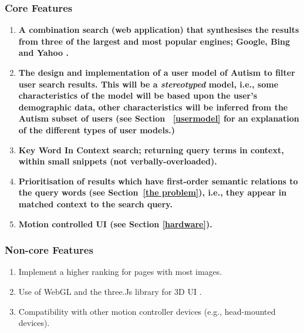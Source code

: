 \documentclass[a4paper, 10pt]{article}
\begin{document}
\subsubsection{Core Features}\label{core}
\begin{enumerate}
\item  \textbf{A combination search (web application) that synthesises the results from three of the largest and most popular engines; Google, Bing and Yahoo \cite{adam}.}

\item \textbf{The design and implementation of a user model of Autism to filter user search results. This will be a \textit{stereotyped} model, i.e., some characteristics of the model will be based upon the user's demographic data, other characteristics will be inferred from the Autism subset of users (see Section ~\ref{usermodel} for an explanation of the different types of user models.)}

\item \textbf{Key Word In Context search; returning query terms in context, within small snippets (not verbally-overloaded).}

\item \textbf{Prioritisation of results which have first-order semantic relations to the query words (see Section~\ref{the problem}), i.e., they appear in matched context to the search query.}

\item \textbf{Motion controlled UI (see Section \ref{hardware}).}
\end{enumerate}

\subsubsection{Non-core Features}
\begin{enumerate}

\item Implement a higher ranking for pages with most images. 
\item Use of WebGL and the three.Js library for 3D UI .
\item Compatibility with other motion controller devices (e.g., head-mounted devices).

\end{enumerate}
\end{document}
